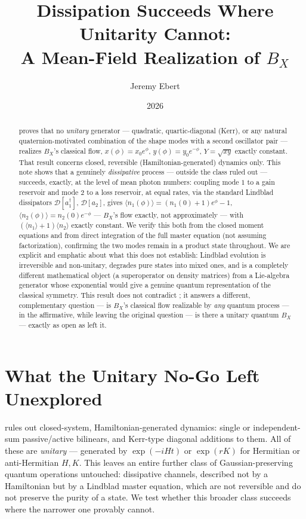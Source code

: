 \documentclass[12pt]{amsart}
\title[Dissipation Succeeds Where Unitarity Cannot]{Dissipation Succeeds Where Unitarity Cannot:\\
A Mean-Field Realization of $B_X$}
\author{Jeremy Ebert}
\date{2026}
\theoremstyle{plain}
\theoremstyle{remark}
\begin{document}
\maketitle

\begin{abstract}
\cite{Ebert2026FourModes} proves that no \emph{unitary} generator --- quadratic, quartic-diagonal (Kerr), or any natural quaternion-motivated combination of the shape modes with a second oscillator pair --- realizes $B_X$'s classical flow, $x(\phi)=x_0e^\phi$, $y(\phi)=y_0e^{-\phi}$, $Y=\sqrt{xy}$ exactly constant. That result concerns closed, reversible (Hamiltonian-generated) dynamics only. This note shows that a genuinely \emph{dissipative} process --- outside the class \cite{Ebert2026FourModes} ruled out --- succeeds, exactly, at the level of mean photon numbers: coupling mode $1$ to a gain reservoir and mode $2$ to a loss reservoir, at equal rates, via the standard Lindblad dissipators $\mathcal D[a_1^\dagger]$, $\mathcal D[a_2]$, gives $\langle n_1(\phi)\rangle=(n_1(0)+1)e^\phi-1$, $\langle n_2(\phi)\rangle=n_2(0)e^{-\phi}$ --- $B_X$'s flow exactly, not approximately --- with $(\langle n_1\rangle+1)\langle n_2\rangle$ exactly constant. We verify this both from the closed moment equations and from direct integration of the full master equation (not assuming factorization), confirming the two modes remain in a product state throughout. We are explicit and emphatic about what this does not establish: Lindblad evolution is irreversible and non-unitary, degrades pure states into mixed ones, and is a completely different mathematical object (a superoperator on density matrices) from a Lie-algebra generator whose exponential would give a genuine quantum representation of the classical symmetry. This result does not contradict \cite{Ebert2026FourModes}; it answers a different, complementary question --- is $B_X$'s classical flow realizable by \emph{any} quantum process --- in the affirmative, while leaving the original question --- is there a unitary quantum $B_X$ --- exactly as open as \cite{Ebert2026FourModes} left it.
\end{abstract}

\section{What the Unitary No-Go Left Unexplored}

\cite{Ebert2026FourModes} rules out closed-system, Hamiltonian-generated dynamics: single or independent-sum passive/active bilinears, and Kerr-type diagonal additions to them. All of these are \emph{unitary} --- generated by $\exp(-iHt)$ or $\exp(rK)$ for Hermitian or anti-Hermitian $H,K$. This leaves an entire further class of Gaussian-preserving quantum operations untouched: dissipative channels, described not by a Hamiltonian but by a Lindblad master equation, which are not reversible and do not preserve the purity of a state. We test whether this broader class succeeds where the narrower one provably cannot.
\end{document}
